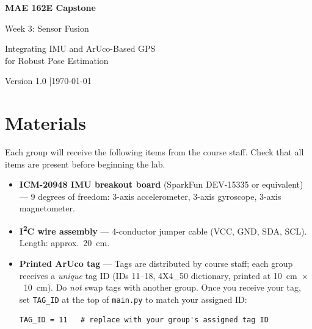 \documentclass[12pt,letterpaper]{article}
\begin{document}

\begin{titlepage}
  \centering
  \vspace*{2cm}
  {\Huge\bfseries MAE 162E Capstone\par}
  \vspace{0.5cm}
  {\LARGE Week 3: Sensor Fusion\par}
  \vspace{0.5cm}
  {\large Integrating IMU and ArUco-Based GPS\\for Robust Pose Estimation\par}
  \vfill
  {\small Version 1.0 \quad|\quad \today}
\end{titlepage}

\tableofcontents
\newpage

\section*{Materials}

Each group will receive the following items from the course staff.
Check that all items are present before beginning the lab.

\begin{itemize}[leftmargin=2em]
  \item \textbf{ICM-20948 IMU breakout board} (SparkFun DEV-15335 or equivalent)
        --- 9 degrees of freedom: 3-axis accelerometer, 3-axis gyroscope, 3-axis
        magnetometer.
  \item \textbf{I\textsuperscript{2}C wire assembly} --- 4-conductor jumper cable
        (VCC, GND, SDA, SCL). Length: approx.\ 20~cm.
  \item \textbf{Printed ArUco tag} --- Tags are distributed by course staff;
        each group receives a \emph{unique} tag ID (IDs 11--18, 4X4\_50
        dictionary, printed at 10~cm~$\times$~10~cm).
        Do \emph{not} swap tags with another group.
        Once you receive your tag, set \texttt{TAG\_ID} at the top of
        \texttt{main.py} to match your assigned ID:
\begin{lstlisting}[style=python]
TAG_ID = 11   # replace with your group's assigned tag ID
\end{lstlisting}
\end{itemize}
\end{document}
